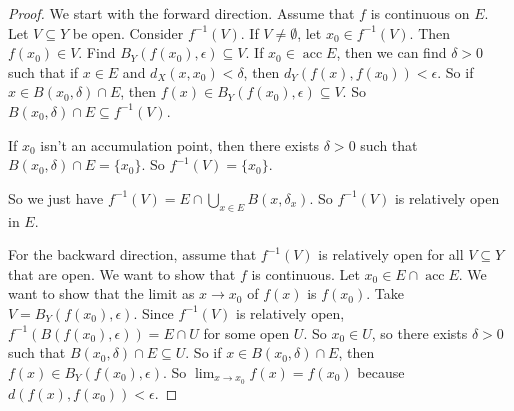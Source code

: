 \documentclass{report}
\begin{document}
\begin{proof}
    We start with the forward direction. Assume that $f$ is continuous on $E$. Let $V \subseteq Y$ be open. Consider $f^{-1}(V)$. If $V \neq \emptyset$, let $x_0 \in f^{-1}(V)$. Then $f(x_0) \in V$. Find $B_Y(f(x_0), \epsilon) \subseteq V$. If $x_0 \in \operatorname{acc}E$, then we can find $\delta > 0$ such that if $x \in E$ and $d_X(x, x_0) < \delta$, then $d_Y(f(x), f(x_0)) < \epsilon$. So if $x \in B(x_0, \delta) \cap E$, then $f(x) \in B_Y(f(x_0), \epsilon) \subseteq V$. So $B(x_0, \delta) \cap E \subseteq f^{-1}(V)$.

    If $x_0$ isn't an accumulation point, then there exists $\delta > 0$ such that $B(x_0, \delta) \cap E = \{x_0\}$. So $f^{-1}(V) = \{x_0\}$. 
    
    So we just have $f^{-1}(V) = E \cap \bigcup_{x \in E} B(x, \delta_x)$. So $f^{-1}(V)$ is relatively open in $E$.

    For the backward direction, assume that $f^{-1}(V)$ is relatively open for all $V \subseteq Y$ that are open. We want to show that $f$ is continuous. Let $x_0 \in E \cap \operatorname{acc}E$. We want to show that the limit as $x \to x_0$ of $f(x)$ is $f(x_0)$. Take $V = B_Y(f(x_0), \epsilon)$. Since $f^{-1}(V)$ is relatively open, $f^{-1}(B(f(x_0), \epsilon)) = E \cap U$ for some open $U$. So $x_0 \in U$, so there exists $\delta > 0$ such that $B(x_0, \delta) \cap E \subseteq U$. So if $x \in B(x_0, \delta) \cap E$, then $f(x) \in B_Y(f(x_0), \epsilon)$. So $\lim_{x \to x_0} f(x) = f(x_0)$ because $d(f(x), f(x_0)) < \epsilon$.
\end{proof}
\newcommand{\acc}{\operatorname{acc}}
\end{document}
